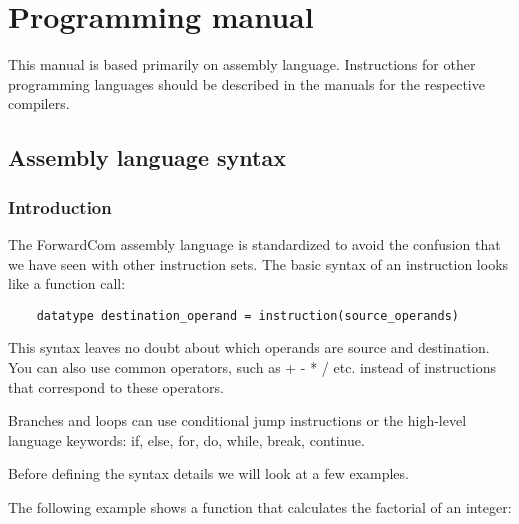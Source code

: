 \documentclass[forwardcom.tex]{subfiles}
\begin{document}
\RaggedRight
\lstset{language=C}            %
\lstset{basicstyle=\ttfamily,breaklines=true}

\chapter{Programming manual}\label{chap:programmingManual}
This manual is based primarily on assembly language. 
Instructions for other programming languages should be described in the manuals for the respective compilers.
\vv


\section{Assembly language syntax} \label{AssemblyLanguageSyntax}

\subsection{Introduction}

The ForwardCom assembly language is standardized to avoid the confusion 
that we have seen with other instruction sets. 
The basic syntax of an instruction looks like a function call:
\vv

\begin{lstlisting}
    datatype destination_operand = instruction(source_operands)
\end{lstlisting}
\vv

This syntax leaves no doubt about which operands are source and destination. 
You can also use common operators, such as + - * / etc. instead of instructions that correspond
to these operators.
\vv

Branches and loops can use conditional jump instructions or the high-level language keywords:
if, else, for, do, while, break, continue.
\vv

Before defining the syntax details we will look at a few examples.
\vv

The following example shows a function that calculates the factorial of an integer:
\end{document}
